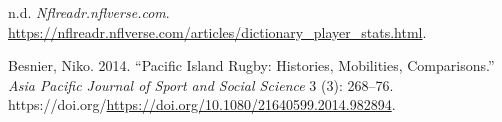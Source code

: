 \documentclass[
  letterpaper,
  DIV=11,
  numbers=noendperiod]{scrartcl}
\newlength{\cslhangindent}
\newenvironment{CSLReferences}[2] %
 {\begin{list}{}{%
  \setlength{\itemindent}{0pt}
  \setlength{\leftmargin}{0pt}
  \setlength{\parsep}{0pt}
  \ifodd #1
   \setlength{\leftmargin}{\cslhangindent}
   \setlength{\itemindent}{-1\cslhangindent}
  \fi
  \setlength{\itemsep}{#2\baselineskip}}}
 {\end{list}}
\begin{document}
\label{refs}
\begin{CSLReferences}{1}{0}
n.d. \emph{Nflreadr.nflverse.com}.
\url{https://nflreadr.nflverse.com/articles/dictionary_player_stats.html}.

Besnier, Niko. 2014. {``Pacific Island Rugby: Histories, Mobilities,
Comparisons.''} \emph{Asia Pacific Journal of Sport and Social Science}
3 (3): 268--76.
https://doi.org/\url{https://doi.org/10.1080/21640599.2014.982894}.

\end{CSLReferences}
\end{document}
